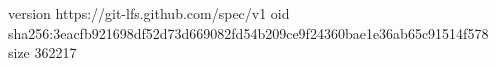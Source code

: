 version https://git-lfs.github.com/spec/v1
oid sha256:3eacfb921698df52d73d669082fd54b209ce9f24360bae1e36ab65c91514f578
size 362217
